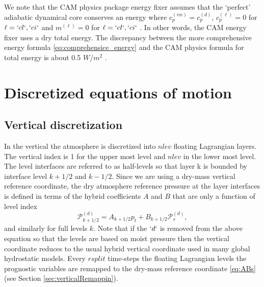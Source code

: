 \documentclass{agujournal}
\begin{document}
We note that the CAM physics package energy fixer assumes that the `perfect' adiabatic dynamical core conserves an energy where $c_p^{(vw)}= c_p^{(d)}$, $c_p^{(\ell)}=0$ for $\ell=`cl`,`ci`$ and $m^{(\ell)}=0$ for $\ell=`cl`,`ci`$ \citep{WOHTTV2015JAMES}. In other words, the CAM energy fixer uses a dry total energy. The discrepancy between the more comprehensive energy formula \eqref{eq:comprehensice_energy} and the CAM physics formula for total energy is about 0.5 $W/m^2$ \citep{T2011LNCSEb}.

%



\section{Discretized equations of motion}\label{sec:discretized_eqs}
\subsection{Vertical discretization}
In the vertical the atmosphere is discretized into $nlev$ floating Lagrangian layers. The vertical index is 1 for the upper most level and $nlev$ in the lower most level. The level interfaces are referred to as half-levels so that layer k is bounded by interface level $k+1/2$ and $k-1/2$. Since we are using a dry-mass vertical reference coordinate, the dry atmosphere reference pressure at the layer interfaces is defined in terms of the hybrid coefficients $A$ and $B$
 that are only a function of level index
\begin{equation}
\mathcal{P}^{(d)}_{k+1/2}=A_{k+1/2}p_t+B_{k+1/2}\mathcal{P}_s^{(d)},\label{eq:ABs}
\end{equation}
and similarly for full levels $k$. Note that if the $`d`$ is removed from the above equation so that the levels are based on moist pressure then the vertical coordinate reduces to the usual hybrid vertical coordinate used in many global hydrostatic models. Every $rsplit$ time-steps the floating Lagrangian levels the prognostic variables are remapped to the dry-mass reference coordinate \eqref{eq:ABs} (see Section \ref{sec:verticalRemappin}). 
\end{document}
